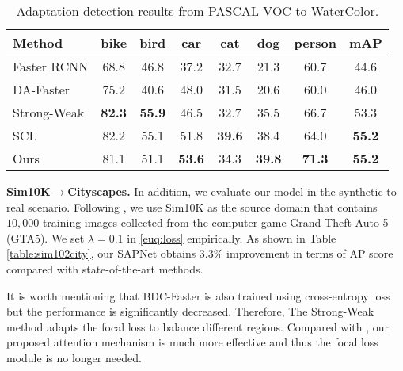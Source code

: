 \documentclass[runningheads]{llncs}
\begin{document}
\begin{table*}[t]
\centering
\caption{Adaptation detection results from PASCAL VOC to WaterColor.}
\setlength{\tabcolsep}{7.5pt}
\begin{tabular}{l|cccccc|c}
\hline
Method & bike &bird &car &cat &dog &person& mAP\\
\hline
Faster RCNN              & 68.8& 46.8& 37.2& 32.7& 21.3& 60.7& 44.6 \\
DA-Faster \cite{DBLP:conf/cvpr/Chen0SDG18} & 75.2& 40.6& 48.0& 31.5& 20.6& 60.0& 46.0 \\
Strong-Weak \cite{DBLP:conf/cvpr/SaitoUHS19} & \bf82.3& \bf55.9& 46.5& 32.7& 35.5& 66.7& 53.3 \\
SCL \cite{DBLP:journals/corr/abs-1911-02559}                 & 82.2& 55.1& 51.8& \bf39.6&38.4 & 64.0& \bf55.2 \\
Ours                          &81.1   &51.1 &\bf53.6 &34.3 &\bf39.8 &\bf71.3 & \bf55.2 \\
\hline
\end{tabular}
\label{table:voc2watercolor}
\end{table*}

\noindent \textbf{Sim10K$\to$Cityscapes.} In addition, we evaluate our model in the synthetic to real scenario. Following \cite{DBLP:conf/cvpr/Chen0SDG18,DBLP:conf/cvpr/SaitoUHS19}, we use Sim10K \cite{DBLP:conf/icra/Johnson-Roberson17} as the source domain that contains $10,000$ training images collected from the computer game Grand Theft Auto 5 (GTA5). We set $\lambda = 0.1$ in \eqref{euq:loss} empirically. As shown in Table \ref{table:sim102city}, our SAPNet obtains $3.3\%$ improvement in terms of AP score compared with state-of-the-art methods.

It is worth mentioning that BDC-Faster \cite{DBLP:conf/cvpr/SaitoUHS19} is also trained using cross-entropy loss but the performance is significantly decreased. Therefore, The Strong-Weak method \cite{DBLP:conf/cvpr/SaitoUHS19} adapts the focal loss \cite{DBLP:conf/iccv/LinGGHD17} to balance different regions. Compared with \cite{DBLP:conf/cvpr/SaitoUHS19,DBLP:journals/corr/abs-1911-02559}, our proposed attention mechanism is much more effective and thus the focal loss module is no longer needed.
\end{document}

